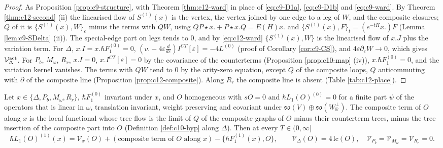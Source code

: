 \begin{proof}
As Proposition \ref{prop:c9-structure}, with Theorem \ref{thm:c12-ward} in place of \eqref{eq:c9-D1a}, \eqref{eq:c9-D1b} and \eqref{eq:c9-ward}. By Theorem \ref{thm:c12-second} (ii) the linearised flow of $S^{(1)}(x)$ is the vertex, the vertex joined by one edge to a leg of $W$, and the composite closures; $Q$ of it is $\{S^{(1)}(x),W\}_\varepsilon$ minus the terms with $QW$, using $QP\star x.+P\star x.Q=E(H)x.$ and $\{S^{(1)}(x),F\}_t=(e^{-tH}x.)F$ (Lemma \ref{lem:c9-SDelta} (ii)). The special-edge part on legs tends to $0$, and by \eqref{eq:c12-ward} $\{S^{(1)}(x),W\}$ is the linearised flow of $x.J$ plus the variation term. For $\Delta$, $x.I=x.\hbar F_1^{(0)}=0$, $(v.-4\varepsilon\tfrac d{d\varepsilon})I^{CT}[\varepsilon]=-4L^{(0)}$ (proof of Corollary \ref{cor:c9-CS}), and $4\varepsilon\partial_\varepsilon W\to0$, which gives $\mathcal V^{\rm act}_\Delta$. For $P_b$, $M_\omega$, $R_r$, $x.I=0$, $x.I^{CT}[\varepsilon]=0$ by the covariance of the counterterms (Proposition \ref{prop:c10-map} (iv)), $x.\hbar F_1^{(0)}=0$, and the variation kernel vanishes. The terms with $QW$ tend to $0$ by the arity-zero equation, except $Q$ of the composite loops, $Q$ anticommuting with $\partial$ of the composite line (Proposition \ref{prop:c12-composite}). Along $R_r$ the composite line is absent (Table \ref{tab:c12-place}).
\end{proof}

\begin{theorem}
\label{thm:c12-conj}
Let $x\in\{\Delta,P_b,M_\omega,R_r\}$, $\hbar F_1^{(0)}$ invariant under $x$, and $O$ homogeneous with $sO=0$ and $\hbar L_1(O)^{(0)}=0$ for a finite part $\psi$ of the operators that is linear in $\omega$, translation invariant, weight preserving and covariant under $\mathfrak{so}(V)\oplus\mathfrak{so}(W_{\mathbb R}^\perp)$. The composite term of $O$ along $x$ is the local functional whose tree flow is the limit of $Q$ of the composite graphs of $O$ minus their counterterm trees, minus the tree insertion of the composite part into $O$ (Definition \ref{def:c10-hyp} along $\Delta$). Then at every $T\in(0,\infty]$
\begin{equation}
\hbar L_1(O)^{(1)}(x)=\mathcal V_x(O)+(\text{composite term of }O\text{ along }x)-\big\{\hbar F_1^{(1)}(x),O\big\},\qquad \mathcal V_\Delta(O)=4\,\mathrm{lc}(O),\quad \mathcal V_{P_b}=\mathcal V_{M_\omega}=\mathcal V_{R_r}=0 .
\label{eq:c12-conjev}
\end{equation}
\end{theorem}

